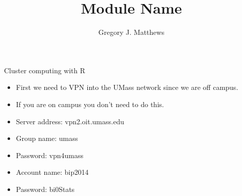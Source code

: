 

\title{Module Name}
\newcommand{\ModuleShortname}{shortName}
\author{Gregory J. Matthews}
\newcommand{\LicenseText}{Made available under the Creative Commons Attribution-ShareAlike 3.0 Unported License: http://creativecommons.org/licenses/by-sa/3.0/deed.en\textunderscore US }
\newcommand{\Instructor}{}
\newcommand{\Course}{}






\begin{frame}[plain]
	\titlepage
\end{frame}


\begin{frame}{Cluster computing with R}
\begin{itemize}
\item First we need to VPN into the UMass network since we are off campus.  
\item If you are on campus you don't need to do this.  
\item Server address: vpn2.oit.umass.edu
\item Group name: umass
\item Password: vpn4umass
\item Account name: bip2014
\item Password: bi0Stats
\end{itemize}
\end{frame}


